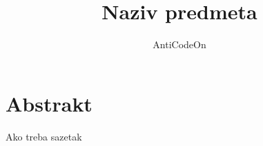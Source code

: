 \documentclass{article}
\title{Naziv predmeta}
\author{AntiCodeOn}
\begin{document}
\maketitle

\frontmatter
\tableofcontents
\listoffigures
\listoftables

\chapter{Abstrakt}

Ako treba sazetak

\mainmatter










\backmatter

\end{document}
